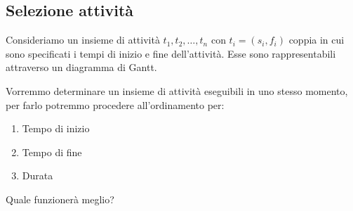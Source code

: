 \subsection{Selezione attività}

Consideriamo un insieme di attività $t_1, t_2, \ldots , t_n$ con $t_i = (s_i, f_i)$ coppia in cui sono specificati i tempi di inizio e fine dell'attività. Esse sono rappresentabili attraverso un diagramma di Gantt.



Vorremmo determinare un insieme di attività eseguibili in uno stesso momento, per farlo potremmo procedere all'ordinamento per:

\begin{enumerate}
\item Tempo di inizio
\item Tempo di fine
\item Durata
\end{enumerate}

Quale funzionerà meglio?
